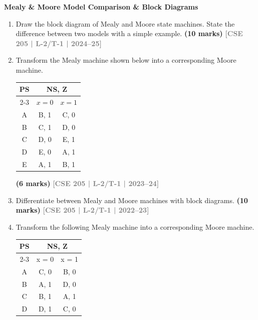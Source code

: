 \documentclass[12pt,a3paper]{article}
\newcommand{\yr}[1]{\hfill\textcolor{gray}{\small\textbf{[#1]}}}
\newcommand{\mk}[1]{\textcolor{orange!70!black}{\small\textbf{(#1 marks)}}}
\newcommand{\subtopic}[2]{%
  \vspace{10pt}
  \noindent\begin{tcolorbox}[colback=#1!8,colframe=#1,boxrule=0.6pt,arc=4pt,
    left=6pt,right=6pt,top=4pt,bottom=4pt]
    \small\bfseries\textcolor{#1}{#2}
  \end{tcolorbox}
  \vspace{2pt}
}
\begin{document}
\subtopic{cF}{Mealy \& Moore Model Comparison \& Block Diagrams}
\label{sub:s6-mealy-moore}

\begin{enumerate}

\item Draw the block diagram of Mealy and Moore state machines. State the difference between two models with a simple example.
\mk{10} \yr{CSE 205 | L-2/T-1 | 2024--25}

\item Transform the Mealy machine shown below into a corresponding Moore machine.

\begin{center}
\begin{tabular}{|c|c|c|}
\hline
\multirow{2}{*}{PS} & \multicolumn{2}{c|}{NS, Z} \\ \cline{2-3}
 & $x=0$ & $x=1$ \\ \hline
A & B, 1 & C, 0 \\ \hline
B & C, 1 & D, 0 \\ \hline
C & D, 0 & E, 1 \\ \hline
D & E, 0 & A, 1 \\ \hline
E & A, 1 & B, 1 \\ \hline
\end{tabular}
\end{center}

\mk{6} \yr{CSE 205 | L-2/T-1 | 2023--24}

\item Differentiate between Mealy and Moore machines with block diagrams.
\mk{10} \yr{CSE 205 | L-2/T-1 | 2022--23}

\item Transform the following Mealy machine into a corresponding Moore machine.

\begin{center}
  \begin{tabular}{|c|c|c|}
\hline
\multirow{2}{*}{PS} & \multicolumn{2}{c|}{NS, Z} \\ \cline{2-3} 
                    & x = 0        & x = 1        \\ \hline
A                   & C, 0         & B, 0         \\ \hline
B                   & A, 1         & D, 0         \\ \hline
C                   & B, 1         & A, 1         \\ \hline
D                   & D, 1         & C, 0         \\ \hline
\end{tabular}
\end{center}


\end{enumerate}
\end{document}
